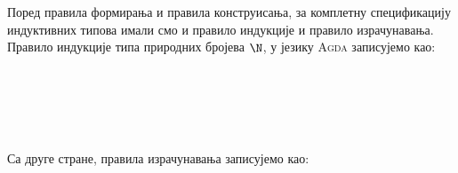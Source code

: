 Поред правила формирања и правила конструисања, за комплетну спецификацију индуктивних типова имали смо и правило индукције и правило израчунавања. Правило индукције типа природних бројева $\N$, у језику \textsc{Agda} записујемо као:
\begin{code} %
\>[0]%
\>[29I]\AgdaSymbol{:}\AgdaSpace{}%
\AgdaSymbol{(}\AgdaSpace{}%
\AgdaSymbol{:}\AgdaSpace{}%
\AgdaSpace{}%
\AgdaSpace{}%
\AgdaSpace{}%
\AgdaSpace{}%
\AgdaSymbol{)}\<%
\\
\>[.][@{}l@{}]\<[29I]%
\>[12]\AgdaSpace{}%
\AgdaSpace{}%
\<%
\\
%
\>[12]\AgdaSpace{}%
\AgdaSymbol{((}\AgdaSpace{}%
\AgdaSymbol{:}\AgdaSpace{}%
\AgdaSymbol{)}\AgdaSpace{}%
\AgdaSpace{}%
\AgdaSpace{}%
\AgdaSpace{}%
\AgdaSpace{}%
\AgdaSpace{}%
\AgdaSymbol{(}\AgdaSpace{}%
\AgdaSymbol{))}\<%
\\
%
\>[12]\AgdaSpace{}%
\AgdaSymbol{(}\AgdaSpace{}%
\AgdaSymbol{:}\AgdaSpace{}%
\AgdaSymbol{)}\AgdaSpace{}%
\AgdaSpace{}%
\AgdaSpace{}%
\<%
\\
\>[0]\<%
\end{code}
Са друге стране, правила израчунавања записујемо као:
\begin{code}%
\>[0]\AgdaSpace{}%
\AgdaSpace{}%
\AgdaSpace{}%
\AgdaSpace{}%
%
\>[29]\AgdaSymbol{=}\AgdaSpace{}%
\<%
\\
\>[0]\AgdaSpace{}%
\AgdaSpace{}%
\AgdaSpace{}%
\AgdaSpace{}%
\AgdaSymbol{(}\AgdaSpace{}%
\AgdaSymbol{)}\AgdaSpace{}%
\AgdaSymbol{=}\AgdaSpace{}%
\AgdaSpace{}%
\AgdaSpace{}%
\AgdaSymbol{(}\AgdaSpace{}%
\AgdaSpace{}%
\AgdaSpace{}%
\AgdaSpace{}%
\AgdaSymbol{)}\<%
\end{code}

